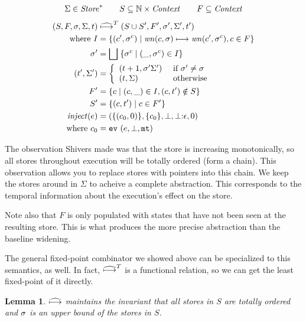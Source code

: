 \documentclass[preprint,onecolumn,9pt]{sigplanconf} %
\newtheorem{lemma}{Lemma}
\begin{document}
{\small
\begin{align*}
\Sigma \in \mathit{Store}^* \qquad S \subseteq {\mathbb N} \times \mathit{Context} \qquad F \subseteq \mathit{Context}
\end{align*}
\begin{align*}
(S, F, \sigma, \Sigma, t) &\mathrel{\widehat{\mathbin{\longmapsto}}^T} (S \cup S', F', \sigma', \Sigma', t') \\
\mbox{where } I &= \{(c',\sigma^c) \mid \mathit{wn}(c, \sigma) \mathrel{\mathbin{\longmapsto}} \mathit{wn}(c', \sigma^c), c \in F\} \\
              \sigma' &= \bigsqcup\; \{\sigma^c \mid (\_,\sigma^c) \in I\} \\
              (t',\Sigma') &=\left\{\begin{array}{ll}
                           (t+1,\sigma'\Sigma') & \text{ if } \sigma' \neq \sigma \\
                           (t,\Sigma)   & \text{ otherwise}
                          \end{array}\right. \\
              F' &= \{c \mid (c,\_) \in I, (c,t') \notin S\} \\
              S' &= \{(c,t') \mid c \in F'\}\\
\mathit{inject}(e) &= (\{(c_0, 0)\},\{c_0\},\bot,\bot {\tt :} \epsilon,0) \\
\text{ where } c_0 &= {\tt ev}{\ }({e,\bot,{\tt mt}})
\end{align*}}

The observation Shivers made was that the store is increasing
monotonically, so all stores throughout execution will be totally
ordered (form a chain). This observation allows you to replace stores
with pointers into this chain. We keep the stores around in $\Sigma$
to acheive a complete abstraction. This corresponds to the temporal
information about the execution's effect on the store.

Note also that $F$ is only populated with states that have not been
seen at the resulting store. This is what produces the more precise
abstraction than the baseline widening.

The general fixed-point combinator we showed above can be specialized
to this semantics, as well. In fact, $\widehat{\mathbin{\longmapsto}}^T$ is a functional
relation, so we can get the least fixed-point of it directly.

\begin{lemma}
  $\widehat{\mathbin{\longmapsto}}$ maintains the invariant that all stores in $S$ are
  totally ordered and $\sigma$ is an upper bound of the stores in $S$.
\end{lemma}
\end{document}
